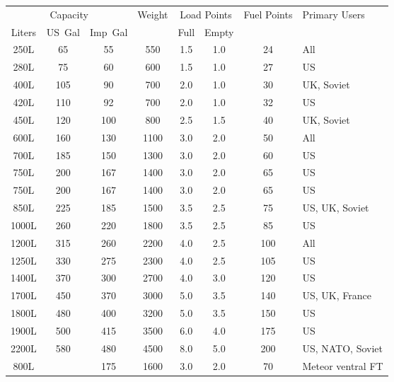 \begin{twocolumntablefloat}
\begin{twocolumntable}
{
\begin{tabular}{cccccccl}
\toprule
\multicolumn{3}{c}{Capacity}&
Weight&
\multicolumn{2}{c}{Load Points}&
Fuel Points&
Primary Users\\
\cmidrule{1-3}
\cmidrule{5-6}
Liters&US~Gal&Imp~Gal&&Full&Empty&&\\
\midrule
\phantom{0}250L&\phantom{0}65&\phantom{0}55&\phantom{0}550&1.5&1.0&\phantom{0}24&All\\
\phantom{0}280L&\phantom{0}75&\phantom{0}60&\phantom{0}600&1.5&1.0&\phantom{0}27&US\\
\phantom{0}400L&\phantom{}105&\phantom{0}90&\phantom{0}700&2.0&1.0&\phantom{0}30&UK, Soviet\\
\phantom{0}420L&\phantom{}110&\phantom{0}92&\phantom{0}700&2.0&1.0&\phantom{0}32&US\\
\phantom{0}450L&\phantom{}120&\phantom{}100&\phantom{0}800&2.5&1.5&\phantom{0}40&UK, Soviet\\
\phantom{0}600L&\phantom{}160&\phantom{0}130&\phantom{}1100&3.0&2.0&\phantom{0}50&All\\
\phantom{0}700L&\phantom{}185&\phantom{0}150&\phantom{}1300&3.0&2.0&\phantom{0}60&US\\
\phantom{0}750L&\phantom{}200&\phantom{0}167&\phantom{}1400&3.0&2.0&\phantom{0}65&US\\
\phantom{0}750L&\phantom{}200&\phantom{0}167&\phantom{}1400&3.0&2.0&\phantom{0}65&US\\
\phantom{0}850L&\phantom{}225&\phantom{0}185&\phantom{}1500&3.5&2.5&\phantom{0}75&US, UK, Soviet\\
\phantom{}1000L&\phantom{}260&\phantom{0}220&\phantom{}1800&3.5&2.5&\phantom{0}85&US\\
\phantom{}1200L&\phantom{}315&\phantom{0}260&\phantom{}2200&4.0&2.5&\phantom{}100&All\\
\phantom{}1250L&\phantom{}330&\phantom{0}275&\phantom{}2300&4.0&2.5&\phantom{}105&US\\
\phantom{}1400L&\phantom{}370&\phantom{0}300&\phantom{}2700&4.0&3.0&\phantom{}120&US\\
\phantom{}1700L&\phantom{}450&\phantom{0}370&\phantom{}3000&5.0&3.5&\phantom{}140&US, UK, France\\
\phantom{}1800L&\phantom{}480&\phantom{0}400&\phantom{}3200&5.0&3.5&\phantom{}150&US\\
\phantom{}1900L&\phantom{}500&\phantom{0}415&\phantom{}3500&6.0&4.0&\phantom{}175&US\\
\phantom{}2200L&\phantom{}580&\phantom{0}480&\phantom{}4500&8.0&5.0&\phantom{}200&US, NATO, Soviet\\
\midrule
\phantom{0}800L&\phantom{}&\phantom{0}175&\phantom{}1600&3.0&2.0&\phantom{0}70&Meteor ventral FT\\
\bottomrule
\end{tabular}

}
\end{twocolumntable}
\end{twocolumntablefloat}